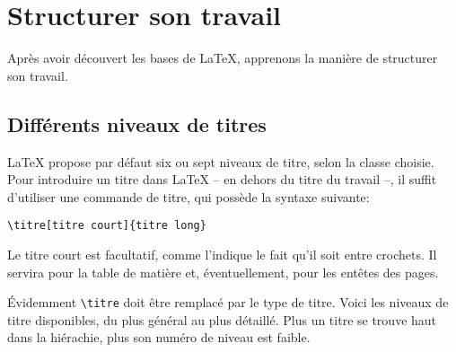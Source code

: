 \chapter{Structurer son travail}
\begin{prealable}
Après avoir découvert les bases de \LaTeX{}, apprenons la manière de structurer son travail.
\end{prealable}

\section{Différents niveaux de titres}\label{niveautitre}

\LaTeX{} propose par défaut six ou sept niveaux de titre, selon la classe choisie.
Pour introduire un titre dans \LaTeX{} -- en dehors du titre du travail --, il suffit d'utiliser une commande de titre, qui possède la syntaxe suivante:
\begin{verbatim}
\titre[titre court]{titre long}
\end{verbatim}

Le titre court est facultatif, comme l'indique le fait qu'il soit entre crochets. Il servira pour la table de matière et, éventuellement, pour les entêtes des pages.

Évidemment \verb|\titre| doit être remplacé par le type de titre. Voici les niveaux de titre disponibles, du plus général au plus détaillé. Plus un titre se trouve haut dans la hiérachie, plus son numéro de niveau est faible.


